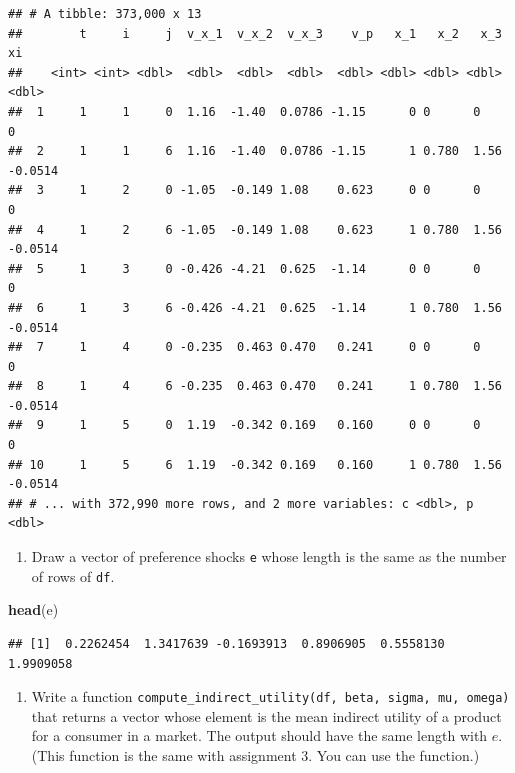 \documentclass[]{book}
\newenvironment{Shaded}{\begin{snugshade}}{\end{snugshade}}
\newcommand{\KeywordTok}[1]{\textcolor[rgb]{0.13,0.29,0.53}{\textbf{#1}}}
\newcommand{\NormalTok}[1]{#1}
\providecommand{\tightlist}{%
  \setlength{\itemsep}{0pt}\setlength{\parskip}{0pt}}
\begin{document}
\begin{verbatim}
## # A tibble: 373,000 x 13
##        t     i     j  v_x_1  v_x_2  v_x_3    v_p   x_1   x_2   x_3      xi
##    <int> <int> <dbl>  <dbl>  <dbl>  <dbl>  <dbl> <dbl> <dbl> <dbl>   <dbl>
##  1     1     1     0  1.16  -1.40  0.0786 -1.15      0 0      0     0     
##  2     1     1     6  1.16  -1.40  0.0786 -1.15      1 0.780  1.56 -0.0514
##  3     1     2     0 -1.05  -0.149 1.08    0.623     0 0      0     0     
##  4     1     2     6 -1.05  -0.149 1.08    0.623     1 0.780  1.56 -0.0514
##  5     1     3     0 -0.426 -4.21  0.625  -1.14      0 0      0     0     
##  6     1     3     6 -0.426 -4.21  0.625  -1.14      1 0.780  1.56 -0.0514
##  7     1     4     0 -0.235  0.463 0.470   0.241     0 0      0     0     
##  8     1     4     6 -0.235  0.463 0.470   0.241     1 0.780  1.56 -0.0514
##  9     1     5     0  1.19  -0.342 0.169   0.160     0 0      0     0     
## 10     1     5     6  1.19  -0.342 0.169   0.160     1 0.780  1.56 -0.0514
## # ... with 372,990 more rows, and 2 more variables: c <dbl>, p <dbl>
\end{verbatim}

\begin{enumerate}
\def\labelenumi{\arabic{enumi}.}
\setcounter{enumi}{5}
\tightlist
\item
  Draw a vector of preference shocks \texttt{e} whose length is the same
  as the number of rows of \texttt{df}.
\end{enumerate}

\begin{Shaded}
\begin{Highlighting}[]
\KeywordTok{head}\NormalTok{(e)}
\end{Highlighting}
\end{Shaded}

\begin{verbatim}
## [1]  0.2262454  1.3417639 -0.1693913  0.8906905  0.5558130  1.9909058
\end{verbatim}

\begin{enumerate}
\def\labelenumi{\arabic{enumi}.}
\setcounter{enumi}{6}
\tightlist
\item
  Write a function
  \texttt{compute\_indirect\_utility(df,\ beta,\ sigma,\ mu,\ omega)}
  that returns a vector whose element is the mean indirect utility of a
  product for a consumer in a market. The output should have the same
  length with \(e\). (This function is the same with assignment 3. You
  can use the function.)
\end{enumerate}
\end{document}
